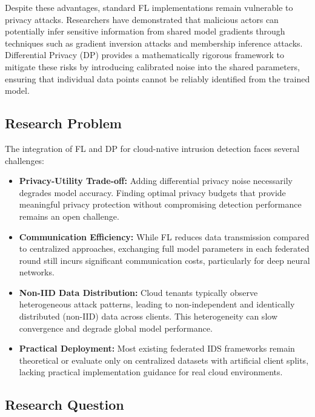 Despite these advantages, standard FL implementations remain vulnerable to privacy attacks. Researchers have demonstrated that malicious actors can potentially infer sensitive information from shared model gradients through techniques such as gradient inversion attacks and membership inference attacks. Differential Privacy (DP) provides a mathematically rigorous framework to mitigate these risks by introducing calibrated noise into the shared parameters, ensuring that individual data points cannot be reliably identified from the trained model.

\subsection{Research Problem}

The integration of FL and DP for cloud-native intrusion detection faces several challenges:

\begin{itemize}
    \item \textbf{Privacy-Utility Trade-off:} Adding differential privacy noise necessarily degrades model accuracy. Finding optimal privacy budgets that provide meaningful privacy protection without compromising detection performance remains an open challenge.
    
    \item \textbf{Communication Efficiency:} While FL reduces data transmission compared to centralized approaches, exchanging full model parameters in each federated round still incurs significant communication costs, particularly for deep neural networks.
    
    \item \textbf{Non-IID Data Distribution:} Cloud tenants typically observe heterogeneous attack patterns, leading to non-independent and identically distributed (non-IID) data across clients. This heterogeneity can slow convergence and degrade global model performance.
    
    \item \textbf{Practical Deployment:} Most existing federated IDS frameworks remain theoretical or evaluate only on centralized datasets with artificial client splits, lacking practical implementation guidance for real cloud environments.
\end{itemize}

\subsection{Research Question}

